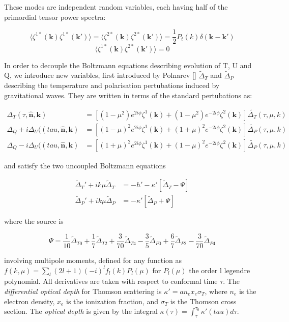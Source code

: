 \documentclass[a4paper,11pt]{article}
\renewcommand{\v}[1]{\mathbf{#1}}
\newcommand{\half}{\frac{1}{2}}
\newcommand{\unit}[1]{\hat{\v{#1}}}
\begin{document}
These modes are independent random variables, each having half of the primordial tensor power spectra:

\begin{equation}
\langle \zeta^{1*}(\v{k})\zeta^{1*}(\v{k'})\rangle=\langle \zeta^{2*}(\v{k})\zeta^{2*}(\v{k'})\rangle=\half P_t(k)\delta(\v{k}-\v{k'})
\end{equation}
\begin{equation}
\langle \zeta^{1*}(\v{k})\zeta^{2*}(\v{k'})\rangle=0
\end{equation}

In order to decouple the Boltzmann equations describing evolution of T, U and Q, we introduce new variables, first introduced by Polnarev [] $\tilde{\Delta}_T$ and $\tilde{\Delta}_P$ describing the temperature and polarisation pertubations induced by gravitational waves. They are written in terms of the standard pertubations as:

\begin{align}
\Delta_T(\tau,\unit{n},\v{k}) &= [(1-\mu^2) e^{2i\phi} \zeta^1(\v{k})+(1-\mu^2) e^{-2i\phi} \zeta^2(\v{k})]\tilde{\Delta_T}(\tau,\mu,k)\\
\Delta_Q+i\Delta_U((tau,\unit{n},\v{k}) &=[(1-\mu)^2 e^{2i\phi} \zeta^1(\v{k})+(1+\mu)^2 e^{-2i\phi} \zeta^2(\v{k})]\tilde{\Delta_P}(\tau,\mu,k) \\
\Delta_Q-i\Delta_U((tau,\unit{n},\v{k}) &=[(1+\mu)^2 e^{2i\phi} \zeta^1(\v{k})+(1-\mu)^2 e^{-2i\phi} \zeta^2(\v{k})]\tilde{\Delta_P}(\tau,\mu,k)
\end{align}

and satisfy the two uncoupled Boltzmann equations

\begin{align}
\tilde{\Delta}_T'+ik\mu \tilde{\Delta}_T &= -h' -\kappa'[\tilde{\Delta}_T - \Psi]\\
\tilde{\Delta}_P'+ik\mu\tilde{\Delta}_P &= -\kappa'[\tilde{\Delta}_P + \Psi]
\end{align}

where the source is

\begin{equation}
\Psi = \frac{1}{10}\tilde{\Delta}_{T0} + \frac{1}{7}\tilde{\Delta}_{T2} + \frac{3}{70}\tilde{\Delta}_{T4} - \frac{3}{5}\tilde{\Delta}_{P0} + \frac{6}{7}\tilde{\Delta}_{P2} - \frac{3}{70}\tilde{\Delta}_{P4}
\end{equation}


involving multipole moments, defined for any function as $f(k, \mu) = \sum_l (2l+1)(-i)^lf_l(k)P_l(\mu)$ for $P_l(\mu)$ the order l legendre polynomial. All derivatives are taken with respect to conformal time $\tau$. The \textit{differential optical depth} for Thomson scattering is $\kappa'=an_ex_e\sigma_T$, where $n_e$ is the electron density, $x_e$ is the ionization fraction, and $\sigma_T$ is the Thomson cross section. The \textit{optical depth} is given by the integral $\kappa(\tau) = \int_\tau^{\tau_0} \kappa'(tau)d\tau$. 
\end{document}
